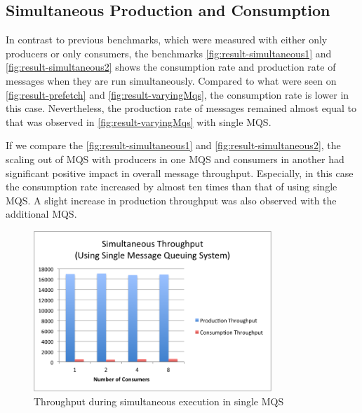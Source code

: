 \subsection{Simultaneous Production and Consumption}
  In contrast to previous benchmarks, which were measured with either only producers or only consumers, the benchmarks \autoref{fig:result-simultaneous1} and \autoref{fig:result-simultaneous2} shows the consumption rate and production rate of messages when they are run simultaneously. Compared to what were seen on \autoref{fig:result-prefetch} and
  \autoref{fig:result-varyingMqs}, the consumption rate is lower in this case. Nevertheless, the production rate of messages remained almost equal to that was observed in \autoref{fig:result-varyingMqs} with single MQS.

  If we compare the \autoref{fig:result-simultaneous1} and \autoref{fig:result-simultaneous2}, the scaling out of MQS with producers in one MQS and consumers in another had significant positive impact in overall message throughput. Especially, in this case the consumption rate increased by almost ten times than that of using single MQS. A slight increase in production throughput was also observed with the additional MQS.

\begin{figure}[H]
  \centering
  \includegraphics[width=0.8\textwidth]{figures/07simultaneous1}
  \caption[Throughput during simultaneous execution in single MQS]{Throughput during simultaneous execution in single MQS}
  \label{fig:result-simultaneous1}
\end{figure}

